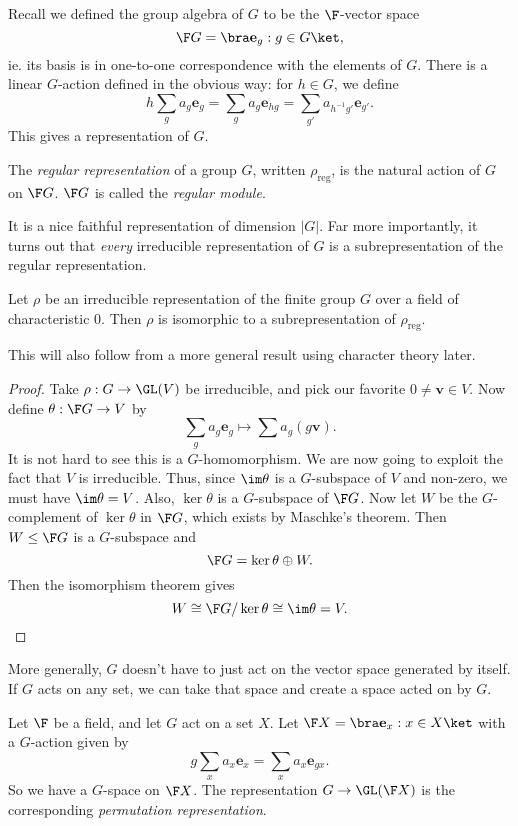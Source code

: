 \documentclass[a4paper]{article}
\begin{document}
Recall we defined the group algebra of $G$ to be the $\F$-vector space
\[
  \F G = \bra \mathbf{e}_g: g \in G\ket,
\]
ie. its basis is in one-to-one correspondence with the elements of $G$. There is a linear $G$-action defined in the obvious way: for $h \in G$, we define
\[
  h \sum_g a_g \mathbf{e}_g = \sum_g a_g \mathbf{e}_{hg} = \sum_{g'} a_{h^{-1}g'} \mathbf{e}_{g'}.
\]
This gives a representation of $G$.
\begin{defi}
  The \emph{regular representation} of a group $G$, written $\rho_{\mathrm{reg}}$, is the natural action of $G$ on $\F G$. $\F G$ is called the \emph{regular module}.
\end{defi}
It is a nice faithful representation of dimension $|G|$. Far more importantly, it turns out that \emph{every} irreducible representation of $G$ is a subrepresentation of the regular representation.

\begin{prop}
  Let $\rho$ be an irreducible representation of the finite group $G$ over a field of characteristic 0. Then $\rho$ is isomorphic to a subrepresentation of $\rho_{\mathrm{reg}}$.
\end{prop}

This will also follow from a more general result using character theory later.
\begin{proof}
  Take $\rho: G \to \GL(V)$ be irreducible, and pick our favorite $0 \not= \mathbf{v} \in V$. Now define $\theta: \F G \to V$ by
  \[
    \sum_g a_g \mathbf{e}_g \mapsto \sum a_g (g\mathbf{v}).
  \]
  It is not hard to see this is a $G$-homomorphism. We are now going to exploit the fact that $V$ is irreducible. Thus, since $\im \theta$ is a $G$-subspace of $V$ and non-zero, we must have $\im \theta = V$. Also, $\ker \theta$ is a $G$-subspace of $\F G$. Now let $W$ be the $G$-complement of $\ker \theta$ in $\F G$, which exists by Maschke's theorem. Then $W \leq \F G$ is a $G$-subspace and
  \[
    \F G = \ker \theta \oplus W.
  \]
  Then the isomorphism theorem gives
  \[
    W\cong \F G / \ker \theta \cong \im \theta = V.
  \]
\end{proof}
More generally, $G$ doesn't have to just act on the vector space generated by itself. If $G$ acts on any set, we can take that space and create a space acted on by $G$.
\begin{defi}
  Let $\F$ be a field, and let $G$ act on a set $X$. Let $\F X = \bra \mathbf{e}_x: x \in X\ket$ with a $G$-action given by
  \[
    g \sum_x a_x \mathbf{e}_x = \sum_x a_x \mathbf{e}_{gx}.
  \]
  So we have a $G$-space on $\F X$. The representation $G \to \GL(\F X)$ is the corresponding \emph{permutation representation}.
\end{defi}
\end{document}
